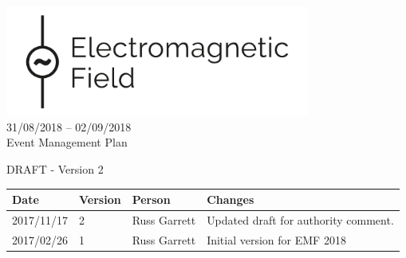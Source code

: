 

\newcommand{\st}{\textsuperscript{st} }
\newcommand{\nd}{\textsuperscript{nd} }
\renewcommand{\th}{\textsuperscript{th} }
\newcommand{\rd}{\textsuperscript{rd} }
\newcommand{\sq}{\textsuperscript{2}}




\begin{titlepage}
\thispagestyle{empty}
\begin{center}
    \includegraphics[width=10cm]{../resources/emf-logo.png}\\[24pt]
    {\LARGE 31/08/2018 -- 02/09/2018} \\[48pt]

    {\Large Event Management Plan}

    DRAFT - Version 2

    \vfill

    \begin{tabular}{l | l | l | p{10cm}}
      Date & Version & Person & Changes \\
      \hline
      2017/11/17 & 2 & Russ Garrett & Updated draft for authority comment. \\
      2017/02/26 & 1 & Russ Garrett & Initial version for EMF 2018 \\
    \end{tabular}
\end{center}
\end{titlepage}
\setcounter{page}{2}

\tableofcontents

\newpage



